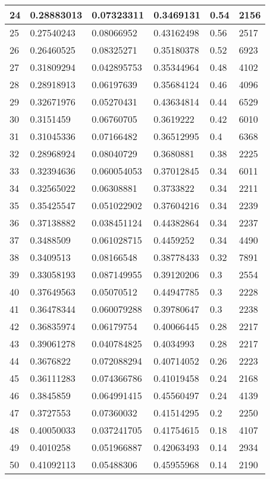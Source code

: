 \begin{longtable}{|l|l|l|l|l|l|}
24 & 0.28883013 & 0.07323311 & 0.3469131 & 0.54 & 2156 \\ \hline 
25 & 0.27540243 & 0.08066952 & 0.43162498 & 0.56 & 2517 \\ \hline 
26 & 0.26460525 & 0.08325271 & 0.35180378 & 0.52 & 6923 \\ \hline 
27 & 0.31809294 & 0.042895753 & 0.35344964 & 0.48 & 4102 \\ \hline 
28 & 0.28918913 & 0.06197639 & 0.35684124 & 0.46 & 4096 \\ \hline 
29 & 0.32671976 & 0.05270431 & 0.43634814 & 0.44 & 6529 \\ \hline 
30 & 0.3151459 & 0.06760705 & 0.3619222 & 0.42 & 6010 \\ \hline 
31 & 0.31045336 & 0.07166482 & 0.36512995 & 0.4 & 6368 \\ \hline 
32 & 0.28968924 & 0.08040729 & 0.3680881 & 0.38 & 2225 \\ \hline 
33 & 0.32394636 & 0.060054053 & 0.37012845 & 0.34 & 6011 \\ \hline 
34 & 0.32565022 & 0.06308881 & 0.3733822 & 0.34 & 2211 \\ \hline 
35 & 0.35425547 & 0.051022902 & 0.37604216 & 0.34 & 2239 \\ \hline 
36 & 0.37138882 & 0.038451124 & 0.44382864 & 0.34 & 2237 \\ \hline 
37 & 0.3488509 & 0.061028715 & 0.4459252 & 0.34 & 4490 \\ \hline 
38 & 0.3409513 & 0.08166548 & 0.38778433 & 0.32 & 7891 \\ \hline 
39 & 0.33058193 & 0.087149955 & 0.39120206 & 0.3 & 2554 \\ \hline 
40 & 0.37649563 & 0.05070512 & 0.44947785 & 0.3 & 2228 \\ \hline 
41 & 0.36478344 & 0.060079288 & 0.39780647 & 0.3 & 2238 \\ \hline 
42 & 0.36835974 & 0.06179754 & 0.40066445 & 0.28 & 2217 \\ \hline 
43 & 0.39061278 & 0.040784825 & 0.4034993 & 0.28 & 2217 \\ \hline 
44 & 0.3676822 & 0.072088294 & 0.40714052 & 0.26 & 2223 \\ \hline 
45 & 0.36111283 & 0.074366786 & 0.41019458 & 0.24 & 2168 \\ \hline 
46 & 0.3845859 & 0.064991415 & 0.45560497 & 0.24 & 4139 \\ \hline 
47 & 0.3727553 & 0.07360032 & 0.41514295 & 0.2 & 2250 \\ \hline 
48 & 0.40050033 & 0.037241705 & 0.41754615 & 0.18 & 4107 \\ \hline 
49 & 0.4010258 & 0.051966887 & 0.42063493 & 0.14 & 2934 \\ \hline 
50 & 0.41092113 & 0.05488306 & 0.45955968 & 0.14 & 2190 \\ \hline 
\end{longtable}
